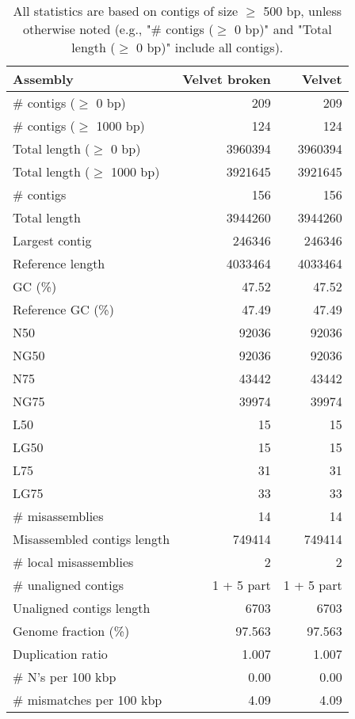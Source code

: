 \documentclass[12pt,a4paper]{article}
\begin{document}
\begin{table}[ht]
\begin{center}
\caption{All statistics are based on contigs of size $\geq$ 500 bp, unless otherwise noted (e.g., "\# contigs ($\geq$ 0 bp)" and "Total length ($\geq$ 0 bp)" include all contigs).}
\begin{tabular}{|l*{2}{|r}|}
\hline
Assembly & Velvet broken & Velvet \\ \hline
\# contigs ($\geq$ 0 bp) & 209 & 209 \\ \hline
\# contigs ($\geq$ 1000 bp) & 124 & 124 \\ \hline
Total length ($\geq$ 0 bp) & 3960394 & 3960394 \\ \hline
Total length ($\geq$ 1000 bp) & 3921645 & 3921645 \\ \hline
\# contigs & 156 & 156 \\ \hline
Total length & 3944260 & 3944260 \\ \hline
Largest contig & 246346 & 246346 \\ \hline
Reference length & 4033464 & 4033464 \\ \hline
GC (\%) & 47.52 & 47.52 \\ \hline
Reference GC (\%) & 47.49 & 47.49 \\ \hline
N50 & 92036 & 92036 \\ \hline
NG50 & 92036 & 92036 \\ \hline
N75 & 43442 & 43442 \\ \hline
NG75 & 39974 & 39974 \\ \hline
L50 & 15 & 15 \\ \hline
LG50 & 15 & 15 \\ \hline
L75 & 31 & 31 \\ \hline
LG75 & 33 & 33 \\ \hline
\# misassemblies & 14 & 14 \\ \hline
Misassembled contigs length & 749414 & 749414 \\ \hline
\# local misassemblies & 2 & 2 \\ \hline
\# unaligned contigs & 1 + 5 part & 1 + 5 part \\ \hline
Unaligned contigs length & 6703 & 6703 \\ \hline
Genome fraction (\%) & 97.563 & 97.563 \\ \hline
Duplication ratio & 1.007 & 1.007 \\ \hline
\# N's per 100 kbp & 0.00 & 0.00 \\ \hline
\# mismatches per 100 kbp & 4.09 & 4.09 \\ \hline

\end{tabular}
\end{center}
\end{table}
\end{document}
